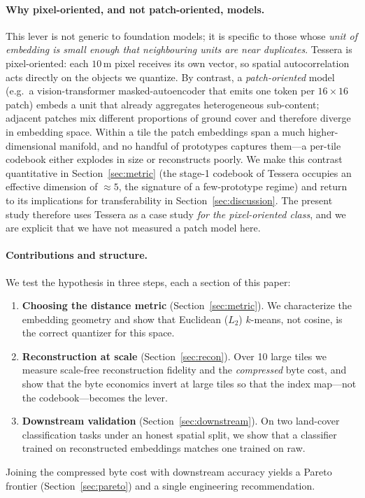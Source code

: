 \documentclass[11pt]{article}
\begin{document}
\paragraph{Why pixel-oriented, and not patch-oriented, models.}
This lever is not generic to foundation models; it is specific to those whose
\emph{unit of embedding is small enough that neighbouring units are near
duplicates}. Tessera is pixel-oriented: each $10\,\mathrm{m}$ pixel receives its
own vector, so spatial autocorrelation acts directly on the objects we quantize.
By contrast, a \emph{patch-oriented} model (e.g.\ a vision-transformer
masked-autoencoder that emits one token per $16\times16$ patch) embeds a unit
that already aggregates heterogeneous sub-content; adjacent patches mix different
proportions of ground cover and therefore diverge in embedding space. Within a
tile the patch embeddings span a much higher-dimensional manifold, and no
handful of prototypes captures them---a per-tile codebook either explodes in
size or reconstructs poorly. We make this contrast quantitative in
Section~\ref{sec:metric} (the stage-1 codebook of Tessera occupies an effective
dimension of ${\approx}5$, the signature of a few-prototype regime) and return to
its implications for transferability in Section~\ref{sec:discussion}. The present
study therefore uses Tessera as a case study \emph{for the pixel-oriented class},
and we are explicit that we have not measured a patch model here.

\paragraph{Contributions and structure.}
We test the hypothesis in three steps, each a section of this paper:
\begin{enumerate}
  \item \textbf{Choosing the distance metric} (Section~\ref{sec:metric}). We
  characterize the embedding geometry and show that Euclidean ($L_2$) $k$-means,
  not cosine, is the correct quantizer for this space.
  \item \textbf{Reconstruction at scale} (Section~\ref{sec:recon}). Over 10 large
  tiles we measure scale-free reconstruction fidelity and the
  \emph{compressed} byte cost, and show that the byte economics invert at large
  tiles so that the index map---not the codebook---becomes the lever.
  \item \textbf{Downstream validation} (Section~\ref{sec:downstream}). On two
  land-cover classification tasks under an honest spatial split, we show that a
  classifier trained on reconstructed embeddings matches one trained on raw.
\end{enumerate}
Joining the compressed byte cost with downstream accuracy yields a Pareto
frontier (Section~\ref{sec:pareto}) and a single engineering recommendation.
\end{document}
